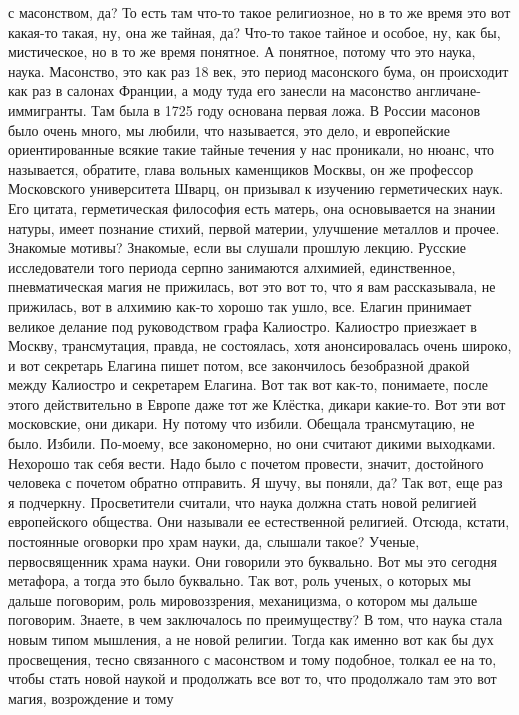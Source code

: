 с масонством, да? То есть там что-то такое религиозное, но в то же время это вот
какая-то такая, ну, она же тайная, да? Что-то такое тайное и особое, ну, как бы,
мистическое, но в то же время понятное. А понятное, потому что это наука, наука.
Масонство, это как раз 18 век, это период масонского бума, он происходит как раз
в салонах Франции, а моду туда его занесли на масонство англичане-иммигранты.
Там была в 1725 году основана первая ложа. В России масонов было очень много, мы
любили, что называется, это дело, и европейские ориентированные всякие такие
тайные течения у нас проникали, но нюанс, что называется, обратите, глава
вольных каменщиков Москвы, он же профессор Московского университета Шварц, он
призывал к изучению герметических наук. Его цитата, герметическая философия есть
матерь, она основывается на знании натуры, имеет познание стихий, первой
материи, улучшение металлов и прочее. Знакомые мотивы? Знакомые, если вы слушали
прошлую лекцию. Русские исследователи того периода серпно занимаются алхимией,
единственное, пневматическая магия не прижилась, вот это вот то, что я вам
рассказывала, не прижилась, вот в алхимию как-то хорошо так ушло, все. Елагин
принимает великое делание под руководством графа Калиостро. Калиостро приезжает
в Москву, трансмутация, правда, не состоялась, хотя анонсировалась очень широко,
и вот секретарь Елагина пишет потом, все закончилось безобразной дракой между
Калиостро и секретарем Елагина. Вот так вот как-то, понимаете, после этого
действительно в Европе даже тот же Клёстка, дикари какие-то. Вот эти вот
московские, они дикари. Ну потому что избили. Обещала трансмутацию, не было.
Избили. По-моему, все закономерно, но они считают дикими выходками. Нехорошо так
себя вести. Надо было с почетом провести, значит, достойного человека с почетом
обратно отправить. Я шучу, вы поняли, да? Так вот, еще раз я подчеркну.
Просветители считали, что наука должна стать новой религией европейского
общества. Они называли ее естественной религией. Отсюда, кстати, постоянные
оговорки про храм науки, да, слышали такое? Ученые, первосвященник храма науки.
Они говорили это буквально. Вот мы это сегодня метафора, а тогда это было
буквально. Так вот, роль ученых, о которых мы дальше поговорим, роль
мировоззрения, механицизма, о котором мы дальше поговорим. Знаете, в чем
заключалось по преимуществу? В том, что наука стала новым типом мышления, а не
новой религии. Тогда как именно вот как бы дух просвещения, тесно связанного с
масонством и тому подобное, толкал ее на то, чтобы стать новой наукой и
продолжать все вот то, что продолжало там это вот магия, возрождение и тому
